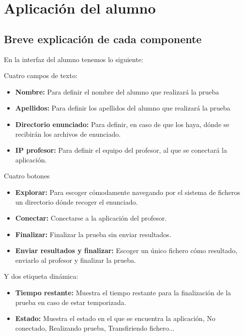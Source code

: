\documentclass[11pt]{article}
\begin{document}
\section{Aplicación del alumno}

\subsection{Breve explicación de cada componente}

En la interfaz del alumno tenemos lo siguiente:

Cuatro campos de texto:

\begin{itemize}

    \item {\bfseries Nombre:} Para definir el nombre del alumno que realizará la prueba
    \item {\bfseries Apellidos:} Para definir los apellidos del alumno que realizará la prueba
    \item {\bfseries Directorio enunciado:} Para definir, en caso de que los haya, dónde se recibirán los archivos de enunciado.
    \item {\bfseries IP profesor:} Para definir el equipo del profesor, al que se conectará la aplicación.

\end{itemize}

Cuatro botones

\begin{itemize}

    \item {\bfseries Explorar:} Para escoger cómodamente navegando por el sistema de ficheros un directorio dónde recoger el enunciado.
    \item {\bfseries Conectar:} Conectarse a la aplicación del profesor.
    \item {\bfseries Finalizar:} Finalizar la prueba sin enviar resultados.
    \item {\bfseries Enviar resultados y finalizar:} Escoger un único fichero cómo resultado, enviarlo al profesor y finalizar la prueba.

\end{itemize}

Y dos etiqueta dinámica:

\begin{itemize}

    \item {\bfseries Tiempo restante:} Muestra el tiempo restante para la finalización de la prueba en caso de estar temporizada.

    \item {\bfseries Estado: } Muestra el estado en el que se encuentra la aplicación, No conectado, Realizando prueba, Transfiriendo fichero...

\end{itemize}
\end{document}
